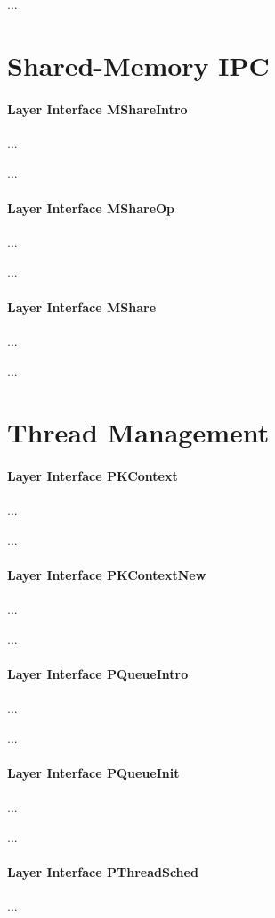 ...

\section{Shared-Memory IPC}

\paragraph{Layer Interface MShareIntro}
...

...

\paragraph{Layer Interface MShareOp}
...

...

\paragraph{Layer Interface MShare}
...

...

\section{Thread Management}

\paragraph{Layer Interface PKContext}
...

...

\paragraph{Layer Interface PKContextNew}
...

...

\paragraph{Layer Interface PQueueIntro}
...

...

\paragraph{Layer Interface PQueueInit}
...

...

\paragraph{Layer Interface PThreadSched}
...

